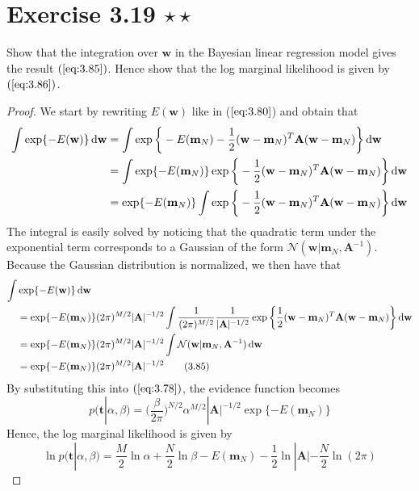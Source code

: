 \section*{Exercise 3.19 $\star \star$}
Show that the integration over $\mathbf{w}$ in the Bayesian 
linear regression model gives the result $(\ref{eq:3.85})$.
Hence show that the log marginal likelihood is given by 
$(\ref{eq:3.86})$.

\vspace{1em}

\begin{proof}
    We start by rewriting $E(\mathbf{w})$ like in ($\ref{eq:3.80}$) and obtain that
    \begin{align*}
        \int \exp\{-E(\mathbf{w})\} \mathop{}\!\mathrm{d} \mathbf{w}
        &= \int \exp\bigg\{-E(\mathbf{m}_N) -
            \frac{1}{2} (\mathbf{w} - \mathbf{m}_N)^T\mathbf{A}(\mathbf{w} - \mathbf{m}_N)
            \bigg\}\mathop{}\!\mathrm{d} \mathbf{w} \\
        &= \int \exp\{-E(\mathbf{m}_N)\}
            \exp\bigg\{-\frac{1}{2} (\mathbf{w} - \mathbf{m}_N)^T\mathbf{A}(\mathbf{w} - \mathbf{m}_N)
            \bigg\}\mathop{}\!\mathrm{d} \mathbf{w} \\
        &= \exp\{-E(\mathbf{m}_N)\}  
            \int \exp\bigg\{-\frac{1}{2} (\mathbf{w} - \mathbf{m}_N)^T\mathbf{A}(\mathbf{w} - \mathbf{m}_N)
            \bigg\}\mathop{}\!\mathrm{d} \mathbf{w}
    \end{align*}
    The integral is easily solved by noticing that the quadratic 
    term under the exponential term corresponds to a Gaussian of
    the form $\mathcal{N}(\mathbf{w} | \mathbf{m}_N, \mathbf{A}^{-1})$.
    Because the Gaussian distribution is normalized, we then have that
    \begin{align*}
        \int &\exp\{-E(\mathbf{w})\} \mathop{}\!\mathrm{d} \mathbf{w} \\
        &= \exp\{-E(\mathbf{m}_N)\} (2\pi)^{M / 2} |\mathbf{A}|^{-1/2}
            \int\frac{1}{(2\pi)^{M/2}}\frac{1}{|\mathbf{A}|^{-1/2}}
            \exp\bigg\{\frac{1}{2}
                (\mathbf{w} - \mathbf{m}_N)^T\mathbf{A}(\mathbf{w} - \mathbf{m}_N)
            \bigg\}\mathop{}\!\mathrm{d} \mathbf{w} \\
        &= \exp\{-E(\mathbf{m}_N)\} (2\pi)^{M / 2} |\mathbf{A}|^{-1/2}
            \int \mathcal{N}(\mathbf{w} | \mathbf{m}_N, \mathbf{A}^{-1}) \mathop{}\!\mathrm{d} \mathbf{w} \\
        &= \exp\{-E(\mathbf{m}_N)\} (2\pi)^{M / 2} |\mathbf{A}|^{-1/2} \label{eq:3.85}\tag{3.85}
    \end{align*}
    By substituting this into $(\ref{eq:3.78})$, the evidence function becomes
    \[
        p(\mathbf{t} | \alpha, \beta) 
        = \bigg(\frac{\beta}{2\pi}\bigg)^{N / 2} \alpha^{M/2} |\mathbf{A}|^{-1/2}
            \exp\{-E(\mathbf{m}_N)\}
    \] 
    Hence, the log marginal likelihood is given by
    \begin{equation}\label{eq:3.86}\tag{3.86}
        \ln p(\mathbf{t} | \alpha, \beta)
        = \frac{M}{2} \ln \alpha + \frac{N}{2} \ln \beta - E(\mathbf{m}_N)
            -\frac{1}{2} \ln|\mathbf{A}| - \frac{N}{2} \ln(2\pi)
    \end{equation}
\end{proof}

